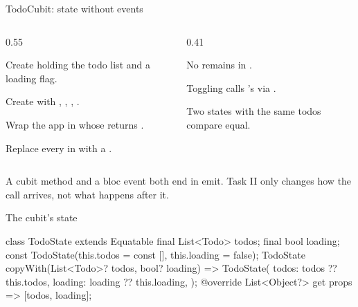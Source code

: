 \documentclass[10pt,aspectratio=169,t]{beamer}
\begin{document}
\begin{frame}[eyebrow=Task I]{TodoCubit: state without events}
  \begin{columns}[T]
    \begin{column}{0.55\textwidth}
      \begin{steps}
        \item Create  holding the todo list and a loading flag.
        \item Create  with , , , .
        \item Wrap the app in  whose  returns .
        \item Replace every  in  with a .
      \end{steps}
    \end{column}
    \begin{column}{0.41\textwidth}
      \begin{checklist}
        \item No  remains in .
        \item Toggling calls 's  via .
        \item Two states with the same todos compare equal.
      \end{checklist}
    \end{column}
  \end{columns}
  \begin{takeaway}{A cubit method and a bloc event both end in emit.}
    Task II only changes how the call arrives, not what happens after it.
  \end{takeaway}
\end{frame}

\begin{frame}[fragile,eyebrow=Task I]{The cubit's state}
\begin{dart}
class TodoState extends Equatable {
  final List<Todo> todos;
  final bool loading;
  const TodoState({this.todos = const [], this.loading = false});
  TodoState copyWith({List<Todo>? todos, bool? loading}) => TodoState(
        todos: todos ?? this.todos,
        loading: loading ?? this.loading,
      );
  @override
  List<Object?> get props => [todos, loading];
}
\end{dart}
\end{frame}
\end{document}
